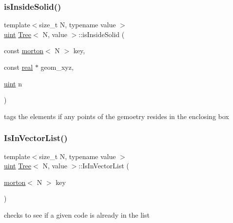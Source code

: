 \mbox{\label{classTree_a2ef8077c21a8972b1ea126ec2fb9d4a5}} 
\subsubsection{\texorpdfstring{is\+Inside\+Solid()}{isInsideSolid()}}
{\footnotesize\ttfamily template$<$size\+\_\+t N, typename value $>$ \\
\mbox{\hyperlink{definitions_8h_a69aa29b598b851b0640aa225a9e5d61d}{uint}} \mbox{\hyperlink{classTree}{Tree}}$<$ N, value $>$\+::is\+Inside\+Solid (\begin{DoxyParamCaption}\item[{const \mbox{\hyperlink{definitions_8h_af8682350bd8bb38ee9023f7a0a310add}{morton}}$<$ N $>$}]{key,  }\item[{const \mbox{\hyperlink{definitions_8h_aedc0ad84d1e764530814f57ad931d02a}{real}} $\ast$}]{geom\+\_\+xyz,  }\item[{\mbox{\hyperlink{definitions_8h_a69aa29b598b851b0640aa225a9e5d61d}{uint}}}]{n }\end{DoxyParamCaption})}

tags the elements if any points of the gemoetry resides in the enclosing box \mbox{\label{classTree_a4bc3620d378608937e528270745f435e}} 
\subsubsection{\texorpdfstring{Is\+In\+Vector\+List()}{IsInVectorList()}}
{\footnotesize\ttfamily template$<$size\+\_\+t N, typename value $>$ \\
\mbox{\hyperlink{definitions_8h_a69aa29b598b851b0640aa225a9e5d61d}{uint}} \mbox{\hyperlink{classTree}{Tree}}$<$ N, value $>$\+::Is\+In\+Vector\+List (\begin{DoxyParamCaption}\item[{\mbox{\hyperlink{definitions_8h_af8682350bd8bb38ee9023f7a0a310add}{morton}}$<$ N $>$}]{key }\end{DoxyParamCaption})}

checks to see if a given code is already in the list \mbox{\label{classTree_a01f065cafedac5e2845e9d17bf87b783}} 
